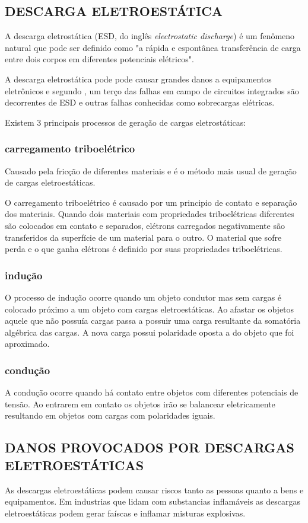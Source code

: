 \documentclass[
	12pt,				%
	openright,			%
	oneside,			%
	a4paper,			%
	chapter=TITLE,		%
	english,			%
	french,				%
	spanish,			%
	brazil,				%
	article,			%
	]{uea-abntex2}
\begin{document}
\subsection{DESCARGA ELETROESTÁTICA}
A descarga eletrostática (ESD, do inglês \textit{electrostatic
discharge}) é um fenômeno natural que pode ser definido como "a rápida e espontânea transferência de carga entre dois corpos em diferentes potenciais elétricos".\cite{esda}

A descarga eletrostática pode pode causar grandes danos a equipamentos eletrônicos \cite{Katsivelis2010} e segundo \citeauthor{Hwang2005}, um terço das falhas em campo de circuitos integrados são decorrentes de ESD e outras falhas conhecidas como sobrecargas elétricas.

Existem 3 principais processos de geração de cargas eletrostáticas:
\subsubsection{carregamento triboelétrico}
Causado pela fricção de diferentes materiais e é o método mais usual de geração de cargas eletroestáticas.

O carregamento triboelétrico é causado por um principio de contato e separação dos materiais. Quando dois materiais com propriedades triboelétricas diferentes são colocados em contato e separados, elétrons carregados negativamente são transferidos da superfície de um material para o outro. O material que sofre perda e o que ganha elétrons é definido por suas propriedades triboelétricas\cite{Hwang2005}. 

\subsubsection{indução}
O processo de indução ocorre quando um objeto condutor mas sem cargas é colocado próximo a um objeto com cargas eletroestáticas. Ao afastar os objetos aquele que não possuía cargas passa a possuir uma carga resultante da somatória algébrica das cargas. A nova carga possui polaridade oposta a do objeto que foi aproximado.
\subsubsection{condução} 
A condução ocorre quando há contato entre objetos com diferentes potenciais de tensão. Ao entrarem em contato os objetos irão se balancear eletricamente resultando em objetos com cargas com polaridades iguais.

\subsection{DANOS PROVOCADOS POR DESCARGAS ELETROESTÁTICAS}
As descargas eletroestáticas podem causar riscos tanto as pessoas quanto a bens e equipamentos.
Em industrias que lidam com substancias inflamáveis as descargas eletroestáticas podem gerar faíscas e inflamar misturas explosivas. \cite{kassebaum}
\end{document}
